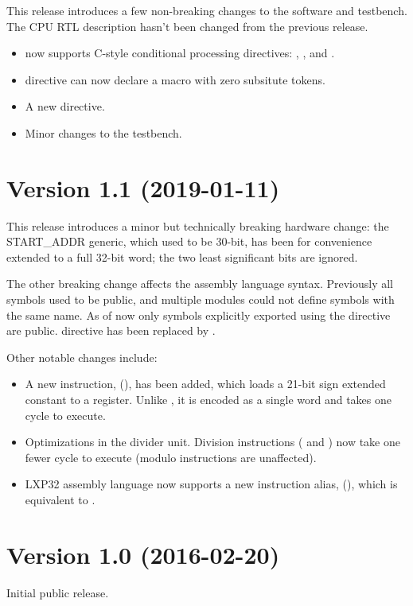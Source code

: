 \documentclass[a4paper,12pt,twoside,extrafontsizes]{memoir}
\begin{document}
This release introduces a few non-breaking changes to the software and testbench. The CPU RTL description hasn't been changed from the previous release.

\begin{itemize}
	\item {} now supports C-style conditional processing directives: , ,  and .
	\item {} directive can now declare a macro with zero subsitute tokens.
	\item A new  directive.
	\item Minor changes to the testbench.
\end{itemize}

\section*{Version 1.1 (2019-01-11)}

This release introduces a minor but technically breaking hardware change: the START\_ADDR generic, which used to be 30-bit, has been for convenience extended to a full 32-bit word; the two least significant bits are ignored.

The other breaking change affects the assembly language syntax. Previously all symbols used to be public, and multiple modules could not define symbols with the same name. As of now only symbols explicitly exported using the  directive are public.  directive has been replaced by .

Other notable changes include:

\begin{itemize}
	\item A new instruction,  (), has been added, which loads a 21-bit sign extended constant to a register. Unlike , it is encoded as a single word and takes one cycle to execute.
	\item Optimizations in the divider unit. Division instructions ( and ) now take one fewer cycle to execute (modulo instructions are unaffected).
	\item LXP32 assembly language now supports a new instruction alias,  (), which is equivalent to .
\end{itemize}

\section*{Version 1.0 (2016-02-20)}

Initial public release.
\end{document}
